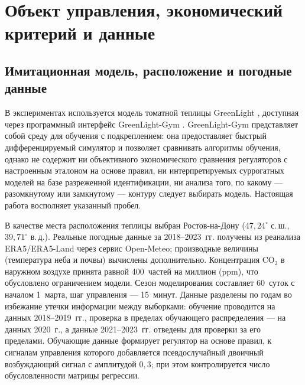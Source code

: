 \documentclass[12pt,a4paper,leqno]{article}
\begin{document}
\section{Объект управления, экономический критерий и данные}
\label{sec:object}

\subsection{Имитационная модель, расположение и погодные данные}
В экспериментах используется модель томатной теплицы GreenLight
\cite{katzin2020,katzin2021}, доступная через программный интерфейс GreenLight-Gym
\cite{vanlaatum2025}. GreenLight-Gym представляет собой среду для обучения с
подкреплением: она предоставляет быстрый дифференцируемый симулятор и позволяет
сравнивать алгоритмы обучения, однако не содержит ни объективного экономического
сравнения регуляторов с настроенным эталоном на основе правил, ни интерпретируемых
суррогатных моделей на базе разреженной идентификации, ни анализа того, по какому —
разомкнутому или замкнутому — контуру следует выбирать модель. Настоящая работа
восполняет указанный пробел.

В качестве места расположения теплицы выбран Ростов-на-Дону ($47{,}24^\circ$ с.\,ш.,
$39{,}71^\circ$ в.\,д.). Реальные погодные данные за 2018--2023~гг. получены из реанализа
ERA5/ERA5-Land через сервис Open-Meteo; производные величины (температура неба и почвы)
вычислены дополнительно. Концентрация CO$_2$ в наружном воздухе принята равной
400~частей на миллион (ppm), что обусловлено ограничением модели. Сезон моделирования
составляет 60~суток с началом 1~марта, шаг управления — 15~минут. Данные разделены по
годам во избежание утечки информации между выборками: обучение проводится на данных
2018--2019~гг., проверка в пределах обучающего распределения — на данных 2020~г., а
данные 2021--2023~гг. отведены для проверки за его пределами. Обучающие данные формирует
регулятор на основе правил, к сигналам управления которого добавляется псевдослучайный
двоичный возбуждающий сигнал с амплитудой $0{,}3$; при этом контролируется число
обусловленности матрицы регрессии.
\end{document}
